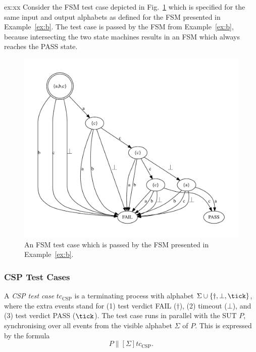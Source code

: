 \begin{example}{ex:xx}
Consider the FSM test case depicted in Fig.~\ref{fig:fsm0tc} which is specified
for the same input and output alphabets as defined for  the FSM presented in Example~\ref{ex:b}. The test case is passed by the FSM from Example~\ref{ex:b}, because
intersecting the two state machines results in an FSM which always reaches the PASS state.
\end{example}


 \begin{figure}
 \begin{center}
\includegraphics[width=.8\textwidth]{fsm0tc.pdf}
\end{center}
\caption{An FSM test case which is passed by the FSM presented in Example~\ref{ex:b}.}
 \label{fig:fsm0tc}
 \end{figure}




\subsubsection*{CSP Test Cases}
\label{sec:csptc}
A \emph{CSP test case} $tc_\text{CSP}$  is a terminating process with alphabet
$\Sigma\cup\{\dag,\bot,\tick \}$, where the extra events stand for
(1) test  verdict FAIL ($\dag$), (2) timeout ($\bot$), and (3) test
 verdict PASS ($\tick$). The test case runs in parallel with the SUT $P$,
 synchronising over all events from the visible alphabet $\Sigma$ of $P$. This is
 expressed by the formula
 $$
 P\parallel[\Sigma] tc_\text{CSP}.
 $$

